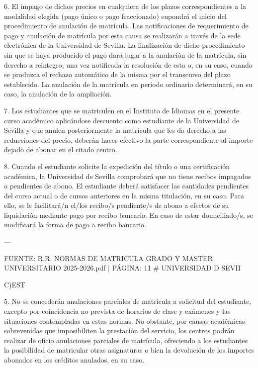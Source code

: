 \documentclass{article}
\begin{document}
\begin{itemize}
\begin{itemize}
\begin{scriptsize}
                  6. El impago de dichos precios en cualquiera de los plazos correspondientes a la modalidad elegida (pago único o pago fraccionado) supondrá el inicio del procedimiento de anulación de matrícula. Las notificaciones de requerimiento de pago y anulación de matrícula por esta causa se realizarán a través de la sede electrónica de la Universidad de Sevilla. La finalización de dicho procedimiento sin que se haya producido el pago dará lugar a la anulación de la matrícula, sin derecho a reintegro, una vez notificada la resolución de esta o, en su caso, cuando se produzca el rechazo automático de la misma por el transcurso del plazo establecido. La anulación de la matrícula en periodo ordinario determinará, en su caso, la anulación de la ampliación.

                  7. Los estudiantes que se matriculen en el Instituto de Idiomas en el presente curso académico aplicándose descuento como estudiante de la Universidad de Sevilla y que anulen posteriormente la matrícula que les da derecho a las reducciones del precio, deberán hacer efectivo la parte correspondiente al importe dejado de abonar en el citado centro.

                  8. Cuando el estudiante solicite la expedición del título o una certificación académica, la Universidad de Sevilla comprobará que no tiene recibos impagados o pendientes de abono. El estudiante deberá satisfacer las cantidades pendientes del curso actual o de cursos anteriores en la misma titulación, en su caso. Para ello, se le facilitará/n el/los recibo/s pendiente/s de abono a efectos de su liquidación mediante pago por recibo bancario. En caso de estar domiciliado/s, se modificará la forma de pago a recibo bancario.

                  ---

                  FUENTE: R.R. NORMAS DE MATRICULA GRADO Y MASTER UNIVERSITARIO 2025-2026.pdf | PÁGINA: 11
                  \# UNIVERSIDAD D SEVII

                  C)EST

                  5. No se concederán anulaciones parciales de matrícula a solicitud del estudiante, excepto por coincidencia no prevista de horarios de clase y exámenes y las situaciones contempladas en estas normas. No obstante, por causas académicas sobrevenidas que imposibiliten la prestación del servicio, los centros podrán realizar de oficio anulaciones parciales de matrícula, ofreciendo a los estudiantes la posibilidad de matricular otras asignaturas o bien la devolución de los importes abonados en los créditos anulados, en su caso.


\end{scriptsize}
\end{itemize}
\end{itemize}
\end{document}
